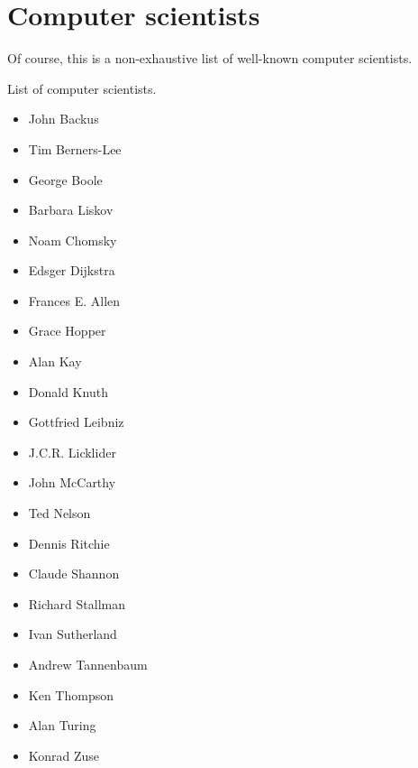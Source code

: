 \section{Computer scientists}
%
Of course, this is a non-exhaustive list of well-known computer scientists.

List of computer scientists.

\begin{itemize}
  \item John Backus
  \item Tim Berners-Lee
  \item George Boole
  \item Barbara Liskov
  \item Noam Chomsky
  \item Edsger Dijkstra
  \item Frances E. Allen
  \item Grace Hopper
  \item Alan Kay
  \item Donald Knuth
  \item Gottfried Leibniz
  \item J.C.R. Licklider
  \item John McCarthy
  \item Ted Nelson
  \item Dennis Ritchie
  \item Claude Shannon
  \item Richard Stallman
  \item Ivan Sutherland
  \item Andrew Tannenbaum
  \item Ken Thompson
  \item Alan Turing
  \item Konrad Zuse
\end{itemize}
